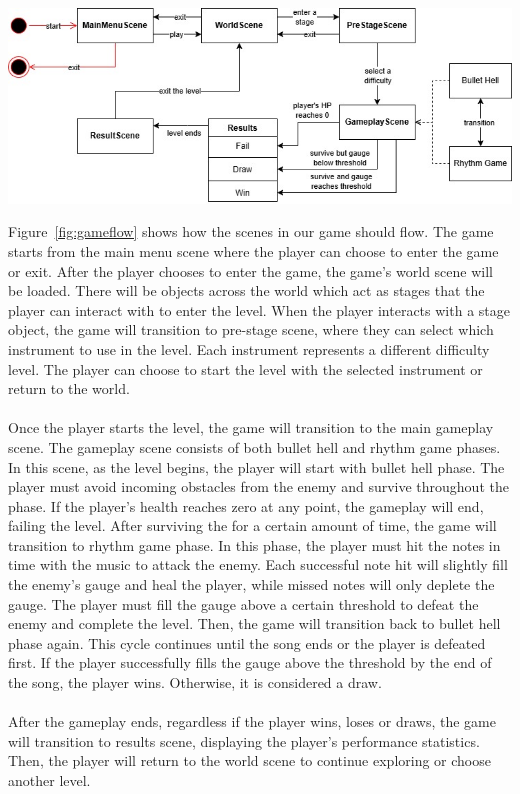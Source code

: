 \vspace{0.5cm}

\noindent
\begin{minipage}{\columnwidth}
    \centering
    \includegraphics[width=\columnwidth, keepaspectratio]{images/gameflow}
    \label{fig:gameflow}
\end{minipage}

\vspace{0.5cm}

\noindent Figure~\ref{fig:gameflow} shows how the scenes in our game should flow.
The game starts from the main menu scene where the player can choose to enter the game or exit.
After the player chooses to enter the game, the game's world scene will be loaded.
There will be objects across the world which act as stages that the player can interact with to 
enter the level.
When the player interacts with a stage object, the game will transition to pre-stage scene, where 
they can select which instrument to use in the level.
Each instrument represents a different difficulty level.
The player can choose to start the level with the selected instrument or return to the world.
\\\\
Once the player starts the level, the game will transition to the main gameplay scene.
The gameplay scene consists of both bullet hell and rhythm game phases.
In this scene, as the level begins, the player will start with bullet hell phase.
The player must avoid incoming obstacles from the enemy and survive throughout the phase.
If the player's health reaches zero at any point, the gameplay will end, failing the level.
After surviving the for a certain amount of time, the game will transition to rhythm game phase.
In this phase, the player must hit the notes in time with the music to attack the enemy.
Each successful note hit will slightly fill the enemy's gauge and heal the player, while missed notes will 
only deplete the gauge.
The player must fill the gauge above a certain threshold to defeat the enemy and complete the level.
Then, the game will transition back to bullet hell phase again.
This cycle continues until the song ends or the player is defeated first.
If the player successfully fills the gauge above the threshold by the end of the song, the player wins.
Otherwise, it is considered a draw.
\\\\
After the gameplay ends, regardless if the player wins, loses or draws, the game will transition to results 
scene, displaying the player's performance statistics.
Then, the player will return to the world scene to continue exploring or choose another level.